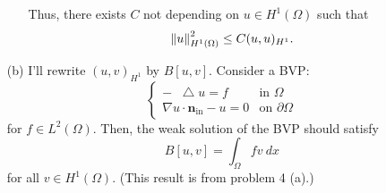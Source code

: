 \documentclass{article}
\newcommand*\Laplace{\mathop{}\!\mathbin\bigtriangleup}
\begin{document}
\begin{enumerate}
\begin{enumerate}
Thus, there exists $C$ not depending on $u\in H^1(\Omega)$ such that
\begin{equation*}
\norm{u}^2_{H^1(\Omega)}\leq C(u,u)_{H^1}.
\end{equation*}
\end{enumerate}
\item[(b)] I'll rewrite $(u,v)_{H^1}$ by $B[u,v]$. Consider a BVP:
\begin{equation*}
\begin{cases}
-\Laplace u=f & \text{in }\Omega\\
\nabla u\cdot \bm{n}_{\text{in}}-u=0 & \text{on }\partial \Omega
\end{cases}
\end{equation*}
for $f\in L^2(\Omega)$. Then, the weak solution of the BVP should satisfy
\begin{equation*}
B[u,v]=\int_\Omega f v~dx
\end{equation*}
for all $v\in H^1(\Omega)$. (This result is from problem 4 (a).)


\end{enumerate}
\end{document}
